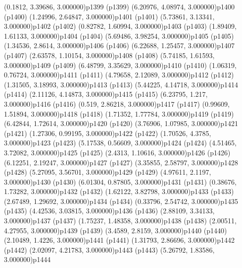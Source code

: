 \psPoint(0.1812, 3.39686, 3.000000){p1399}
\psdot(p1399)
\psPoint(6.20976, 4.08974, 3.000000){p1400}
\psdot(p1400)
\psPoint(1.24996, 2.64847, 3.000000){p1401}
\psdot(p1401)
\psPoint(5.73861, 3.13341, 3.000000){p1402}
\psdot(p1402)
\psPoint(0.82782, 1.60994, 3.000000){p1403}
\psdot(p1403)
\psPoint(1.89409, 1.61133, 3.000000){p1404}
\psdot(p1404)
\psPoint(5.69486, 3.98254, 3.000000){p1405}
\psdot(p1405)
\psPoint(1.34536, 2.8614, 3.000000){p1406}
\psdot(p1406)
\psPoint(6.22688, 1.25457, 3.000000){p1407}
\psdot(p1407)
\psPoint(2.63578, 1.10154, 3.000000){p1408}
\psdot(p1408)
\psPoint(5.74185, 1.61593, 3.000000){p1409}
\psdot(p1409)
\psPoint(6.48799, 3.35629, 3.000000){p1410}
\psdot(p1410)
\psPoint(1.06319, 0.76724, 3.000000){p1411}
\psdot(p1411)
\psPoint(4.79658, 2.12089, 3.000000){p1412}
\psdot(p1412)
\psPoint(1.31505, 3.18993, 3.000000){p1413}
\psdot(p1413)
\psPoint(5.44225, 4.14718, 3.000000){p1414}
\psdot(p1414)
\psPoint(2.11126, 4.14873, 3.000000){p1415}
\psdot(p1415)
\psPoint(6.23795, 1.217, 3.000000){p1416}
\psdot(p1416)
\psPoint(0.519, 2.86218, 3.000000){p1417}
\psdot(p1417)
\psPoint(0.99609, 1.51894, 3.000000){p1418}
\psdot(p1418)
\psPoint(1.71352, 1.77784, 3.000000){p1419}
\psdot(p1419)
\psPoint(6.42844, 1.72614, 3.000000){p1420}
\psdot(p1420)
\psPoint(3.76906, 1.07985, 3.000000){p1421}
\psdot(p1421)
\psPoint(1.27306, 0.99195, 3.000000){p1422}
\psdot(p1422)
\psPoint(1.70526, 4.3785, 3.000000){p1423}
\psdot(p1423)
\psPoint(5.17538, 0.56609, 3.000000){p1424}
\psdot(p1424)
\psPoint(4.51465, 3.72082, 3.000000){p1425}
\psdot(p1425)
\psPoint(2.4313, 1.10616, 3.000000){p1426}
\psdot(p1426)
\psPoint(6.12251, 2.19247, 3.000000){p1427}
\psdot(p1427)
\psPoint(3.35855, 2.58797, 3.000000){p1428}
\psdot(p1428)
\psPoint(5.27095, 3.56701, 3.000000){p1429}
\psdot(p1429)
\psPoint(4.97611, 2.1197, 3.000000){p1430}
\psdot(p1430)
\psPoint(6.01304, 0.87805, 3.000000){p1431}
\psdot(p1431)
\psPoint(0.38676, 1.73282, 3.000000){p1432}
\psdot(p1432)
\psPoint(1.62122, 3.82798, 3.000000){p1433}
\psdot(p1433)
\psPoint(2.67489, 1.29692, 3.000000){p1434}
\psdot(p1434)
\psPoint(0.33796, 2.54742, 3.000000){p1435}
\psdot(p1435)
\psPoint(4.42536, 3.03815, 3.000000){p1436}
\psdot(p1436)
\psPoint(2.88109, 3.34133, 3.000000){p1437}
\psdot(p1437)
\psPoint(1.75237, 1.48358, 3.000000){p1438}
\psdot(p1438)
\psPoint(2.00511, 4.27955, 3.000000){p1439}
\psdot(p1439)
\psPoint(3.4589, 2.8159, 3.000000){p1440}
\psdot(p1440)
\psPoint(2.10489, 1.4226, 3.000000){p1441}
\psdot(p1441)
\psPoint(1.31793, 2.86696, 3.000000){p1442}
\psdot(p1442)
\psPoint(2.02097, 4.21783, 3.000000){p1443}
\psdot(p1443)
\psPoint(5.26792, 1.83586, 3.000000){p1444}

